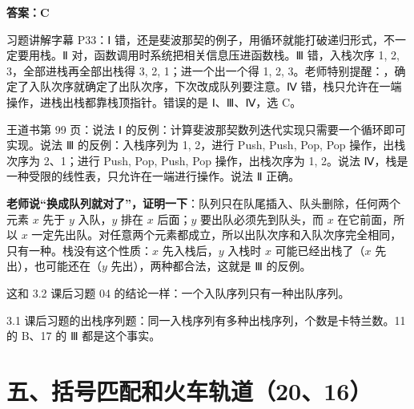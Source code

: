 \documentclass[10.5pt,a4paper,oneside]{article}
\newcommand{\hlred}[1]{\textcolor{wdred}{\bfseries #1}}
\newcommand{\uln}[1]{\CJKunderline[format=\color{wdred},thickness=0.9pt,depth=0.28em]{#1}}
\begin{document}
\hlred{\textbf{答案：C}}

\begin{videobox}

习题讲解字幕 P33：Ⅰ
错，还是斐波那契的例子，用循环就能打破递归形式，不一定要用栈。Ⅱ
对，函数调用时系统把相关信息压进函数栈。Ⅲ 错，入栈次序 1, 2,
3，全部进栈再全部出栈得 3, 2, 1；进一个出一个得 1, 2,
3。老师特别提醒：\uln{如果把 Ⅲ 里的栈换成队列，那就对了}，确定了入队次序就确定了出队次序，下次改成队列要注意。Ⅳ
错，栈只允许在一端操作，进栈出栈都靠栈顶指针。错误的是 Ⅰ、Ⅲ、Ⅳ，选 C。

\end{videobox}

\begin{jiexibox}

王道书第 99 页：说法 Ⅰ
的反例：计算斐波那契数列迭代实现只需要一个循环即可实现。说法 Ⅲ
的反例：入栈序列为 1, 2，进行 Push, Push, Pop, Pop 操作，出栈次序为
2、1；进行 Push, Pop, Push, Pop 操作，出栈次序为 1, 2。说法
Ⅳ，栈是一种受限的线性表，只允许在一端进行操作。说法 Ⅱ 正确。

\end{jiexibox}

\begin{addbox}

\textbf{老师说“换成队列就对了”，证明一下}：队列只在队尾插入、队头删除，任何两个元素
\(x\) 先于 \(y\) 入队，\(y\) 排在 \(x\) 后面；\(y\)
要出队必须先到队头，而 \(x\) 在它前面，所以 \(x\)
一定先出队。对任意两个元素都成立，所以出队次序和入队次序完全相同，只有一种。栈没有这个性质：\(x\)
先入栈后，\(y\) 入栈时 \(x\) 可能已经出栈了（\(x\)
先出），也可能还在（\(y\) 先出），两种都合法，这就是 Ⅲ 的反例。

这和 3.2 课后习题 04 的结论一样：一个入队序列只有一种出队序列。

\end{addbox}

\begin{recallbox}

3.1 课后习题的出栈序列题：同一入栈序列有多种出栈序列，个数是卡特兰数。11
的 B、17 的 Ⅲ 都是这个事实。

\end{recallbox}

\hypertarget{ux4e94ux62ecux53f7ux5339ux914dux548cux706bux8f66ux8f68ux90532016}{%
\section{五、括号匹配和火车轨道（20、16）}\label{ux4e94ux62ecux53f7ux5339ux914dux548cux706bux8f66ux8f68ux90532016}}
\end{document}
